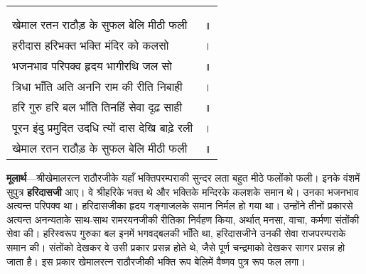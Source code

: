 {
{\bfseries
\setlength{\mylenone}{0pt}
\settowidth{\mylentwo}{}
\setlength{\mylenone}{\maxof{\mylenone}{\mylentwo}}
\settowidth{\mylentwo}{खेमाल रतन राठौड़ के सुफल बेलि मीठी फली}
\setlength{\mylenone}{\maxof{\mylenone}{\mylentwo}}
\settowidth{\mylentwo}{हरीदास हरिभक्त भक्ति मंदिर को कलसो}
\setlength{\mylenone}{\maxof{\mylenone}{\mylentwo}}
\settowidth{\mylentwo}{भजनभाव परिपक्व हृदय भागीरथि जल सो}
\setlength{\mylenone}{\maxof{\mylenone}{\mylentwo}}
\settowidth{\mylentwo}{त्रिधा भाँति अति अननि राम की रीति निबाही}
\setlength{\mylenone}{\maxof{\mylenone}{\mylentwo}}
\settowidth{\mylentwo}{हरि गुरु हरि बल भाँति तिनहिं सेवा दृढ़ साही}
\setlength{\mylenone}{\maxof{\mylenone}{\mylentwo}}
\settowidth{\mylentwo}{पूरन इंदु प्रमुदित उदधि त्यों दास देखि बाढ़े रली}
\setlength{\mylenone}{\maxof{\mylenone}{\mylentwo}}
\settowidth{\mylentwo}{खेमाल रतन राठौड़ के सुफल बेलि मीठी फली}
\setlength{\mylenone}{\maxof{\mylenone}{\mylentwo}}
\setlength{\mylentwo}{\baselineskip}
\setlength{\mylenone}{\mylenone + 1pt}
\begin{longtable}[l]{@{\hspace*{\mylen}}>{\setlength\parfillskip{0pt}}p{\mylenone}@{}@{}l@{}}
 & \\[-\the\mylentwo]
\centering{॥ १२२ \hspace*{-1.5mm}॥} & \\ \nopagebreak
खेमाल रतन राठौड़ के सुफल बेलि मीठी फली & ॥\\
हरीदास हरिभक्त भक्ति मंदिर को कलसो & ।\\ \nopagebreak
भजनभाव परिपक्व हृदय भागीरथि जल सो & ॥\\
त्रिधा भाँति अति अननि राम की रीति निबाही & ।\\ \nopagebreak
हरि गुरु हरि बल भाँति तिनहिं सेवा दृढ़ साही & ॥\\
पूरन इंदु प्रमुदित उदधि त्यों दास देखि बाढ़े रली & ।\\ \nopagebreak
खेमाल रतन राठौड़ के सुफल बेलि मीठी फली & ॥
\end{longtable}
}
}
\begin{sloppypar}\justifying{}
\textbf{मूलार्थ}—श्रीखेमालरत्न राठौरजीके यहाँ भक्ति\-परम्पराकी सुन्दर लता बहुत मीठे फलोंको फली। इनके वंशमें सुपुत्र \textbf{हरिदासजी} आए। वे श्रीहरिके भक्त थे और भक्तिके मन्दिरके कलशके समान थे। उनका भजनभाव अत्यन्त परिपक्व था। हरिदासजीका हृदय गङ्गाजलके समान निर्मल हो गया था। उन्होंने तीनों प्रकारसे अत्यन्त अनन्यताके साथ-साथ रामरयनजीकी रीतिका निर्वहण किया, अर्थात् मनसा, वाचा, कर्मणा संतोंकी सेवा की। हरिस्वरूप गुरुका बल इनमें भगवद्बलकी भाँति था, हरिदासजीने उनकी सेवा राज\-परम्पराके समान की। संतोंको देखकर वे उसी प्रकार प्रसन्न होते थे, जैसे पूर्ण चन्द्रमाको देखकर सागर प्रसन्न हो जाता है। इस प्रकार खेमालरत्न राठौरजीकी भक्ति रूप बेलिमें वैष्णव पुत्र रूप फल लगा।
\end{sloppypar}

